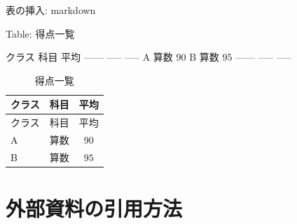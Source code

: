 \documentclass[
  12pt,
  ignorenonframetext,
]{beamer}
\newenvironment{Shaded}{\begin{snugshade}}{\end{snugshade}}
\newcommand{\NormalTok}[1]{#1}
\begin{document}
\begin{frame}[fragile]{表の挿入: markdown}
\protect\hypertarget{ux8868ux306eux633fux5165-markdown}{}

\small

\begin{Shaded}
\begin{Highlighting}[]
\NormalTok{Table: 得点一覧}

\NormalTok{  クラス 科目   平均}
\NormalTok{  ------ ----- -----}
\NormalTok{  A      算数   $90$}
\NormalTok{  B      算数   $95$}
\NormalTok{  ------ ----- -----}
\end{Highlighting}
\end{Shaded}

\normalsize

\begin{longtable}[]{@{}llc@{}}
\caption{得点一覧}\tabularnewline
\toprule
クラス & 科目 & 平均\tabularnewline
\midrule
\endfirsthead
\toprule
クラス & 科目 & 平均\tabularnewline
\midrule
\endhead
A & 算数 & \(90\)\tabularnewline
B & 算数 & \(95\)\tabularnewline
\bottomrule
\end{longtable}

\end{frame}

\hypertarget{ux5916ux90e8ux8cc7ux6599ux306eux5f15ux7528ux65b9ux6cd5}{%
\section{外部資料の引用方法}\label{ux5916ux90e8ux8cc7ux6599ux306eux5f15ux7528ux65b9ux6cd5}}
\end{document}
